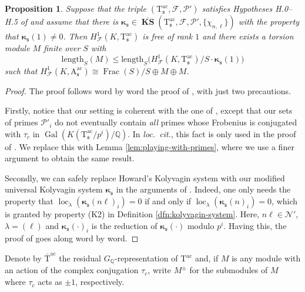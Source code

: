 \documentclass[12pt,reqno]{amsart}
\newtheorem{proposition}[theorem]{Proposition}
\theoremstyle{definition}
\theoremstyle{remark}
\newcommand{\numberset}{\mathbb}
\newcommand{\Q}{\numberset{Q}}
\newcommand{\T}{\boldsymbol{\mathrm{T}}}
\newcommand{\A}{\boldsymbol{\mathrm{A}}}
\DeclareMathOperator{\Gal}{Gal}
\DeclareMathOperator{\Frac}{Frac}
\DeclareMathOperator{\loc}{loc}
\DeclareMathOperator{\ks}{KS}
\newcommand{\KS}{\boldsymbol{\ks}}
\newcommand{\ac}{\mathrm{ac}}
\newcommand{\length}{\mathrm{length}}
\newcommand{\gk}{\kappa}
\newcommand{\gl}{\lambda}
\newcommand{\sfrak}{\mathfrak{s}}
\begin{document}
\begin{proposition}\label{prop:howard-theorem-revised}
    Suppose that the triple $(\T^\ac_\sfrak,\mathcal{F},\mathcal{P}')$ satisfies Hypotheses H.0--H.5 of \cite{Howard04:heegner-point-kolyvagin-system} and assume that there is $\boldsymbol{\gk}_\sfrak\in \overline{\KS}(\T^\ac_\sfrak,\mathcal{F},\mathcal{P}',\{\chi_{n,\ell}\})$ with the property that $\boldsymbol{\gk}_\sfrak(1)\ne 0$. Then $H^1_{\mathcal{F}}(K,\T_{\sfrak}^\ac)$ is free of rank $1$ and there exists a torsion module $M$ finite over $S$ with
    \begin{equation*}
        \length_S(M)\le \length_S\big(H^1_{\mathcal{F}}(K,\T_{\sfrak}^\ac)/S\cdot\boldsymbol{\gk}_\sfrak(1)\big)
    \end{equation*}
    such that $H^1_{\mathcal{F}}(K,\A_{\sfrak}^\ac)\cong \Frac(S)/S\oplus M\oplus M$.
\end{proposition}
\begin{proof}
    The proof follows word by word the proof of \cite[Theorem 1.6.1]{Howard04:heegner-point-kolyvagin-system}, with just two precautions. 
    
    Firstly, notice that our setting is coherent with the one of \cite[§1.6]{Howard04:heegner-point-kolyvagin-system}, except that our sets of primes $\mathcal{P}'_i$ do not eventually contain \emph{all} primes whose Frobenius is conjugated with $\tau_c$ in $\Gal(K(\T^\ac_\sfrak/p^i)/\Q)$. In \emph{loc.~cit.}, this fact is only used in the proof of \cite[Lemma 1.6.2]{Howard04:heegner-point-kolyvagin-system}. We replace this with Lemma \ref{lem:playing-with-primes}, where we use a finer argument to obtain the same result.

    Secondly, we can safely replace Howard's Kolyvagin system with our modified universal Kolyvagin system $\boldsymbol{\gk}_\sfrak$ in the arguments of \cite[§1.6]{Howard04:heegner-point-kolyvagin-system}. Indeed, one only needs the property that $\loc_\gl(\boldsymbol{\gk}_\sfrak(n\ell)_{i})=0$ if and only if $\loc_\gl(\boldsymbol{\gk}_\sfrak(n)_{i})=0$, which is granted by property (K2) in Definition \ref{dfn:kolyvagin-system}. Here, $n\ell\in\mathcal{N}'$, $\gl=(\ell)$ and $\boldsymbol{\gk}_\sfrak(\cdot)_{i}$ is the reduction of $\boldsymbol{\gk}_\sfrak(\cdot)$ modulo $p^i$. Having this, the proof of \cite[Lemma 1.6.4]{Howard04:heegner-point-kolyvagin-system} goes along word by word.
\end{proof}

Denote by $\bar{\T}^\ac$ the residual $G_\Q$-representation of $\T^\ac$ and, if $M$ is any module with an action of the complex conjugation $\tau_c$, write $M^\pm$ for the submodules of $M$ where $\tau_c$ acts as $\pm 1$, respectively.
\end{document}
